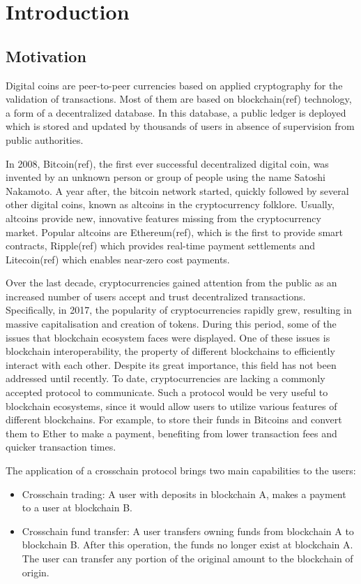 \chapter{Introduction}

\section{Motivation}

Digital coins are peer-to-peer currencies based on applied cryptography for the
validation of transactions. Most of them are based on blockchain(ref)
technology, a form of a decentralized database. In this database, a public
ledger is deployed which is stored and updated by thousands of users in absence
of supervision from public authorities.

In 2008, Bitcoin(ref), the first ever successful decentralized digital coin,
was invented by an unknown person or group of people using the name Satoshi
Nakamoto. A year after, the bitcoin network started, quickly followed by
several other digital coins, known as altcoins in the cryptocurrency folklore.
Usually, altcoins provide new, innovative features missing from the
cryptocurrency market. Popular altcoins are Ethereum(ref), which is the first
to provide smart contracts, Ripple(ref) which provides real-time payment
settlements and Litecoin(ref) which enables near-zero cost payments.

Over the last decade, cryptocurrencies gained attention from the public as an
increased number of users accept and trust decentralized transactions.
Specifically, in 2017, the popularity of cryptocurrencies rapidly grew,
resulting in massive capitalisation and creation of tokens. During this period,
some of the issues that blockchain ecosystem faces were displayed. One of these
issues is blockchain interoperability, the property of different blockchains to
efficiently interact with each other. Despite its great importance, this field
has not been addressed until recently. To date, cryptocurrencies are lacking a
commonly accepted protocol to communicate. Such a protocol would be very useful
to blockchain ecosystems, since it would allow users to utilize various
features of different blockchains. For example, to store their funds in
Bitcoins and convert them to Ether to make a payment, benefiting from lower
transaction fees and quicker transaction times.

The application of a crosschain protocol brings two main capabilities to the
users:
\begin{itemize}
    \item
        Crosschain trading: A user with deposits in blockchain A, makes a
        payment to a user at blockchain B.
    \item
        Crosschain fund transfer: A user transfers owning funds from
        blockchain A to blockchain B. After this operation, the funds no
        longer exist at blockchain A. The user can transfer any portion of the
        original amount to the blockchain of origin.
\end{itemize}

